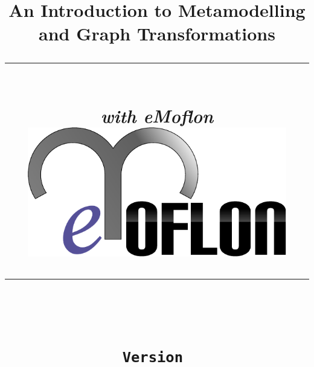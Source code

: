 \title{
\flushright
{\LARGE\bfseries An Introduction to Metamodelling\\
and Graph Transformations}
\noindent\rule[-1ex]{\textwidth}{5pt}\\[2.5ex]
\hfill\emph{\LARGE\bfseries with eMoflon}\\
\flushright
\includegraphics[width=0.85\textwidth]{eMoflon3}
\flushleft
\vspace{3cm}
\noindent\rule[-1ex]{0.5\textwidth}{1.5pt}\\[1.5 ex]
{\LARGE\bfseries \partTitle}\\
{\small \texttt{Version \versionNumber}}
}

\date{}  
\author{} 